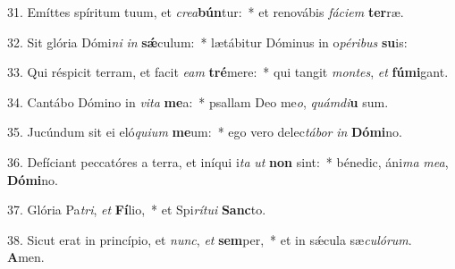 31. Emíttes spíritum tuum, et \textit{cre}\textit{a}\textbf{bún}tur:~*  et renovábis \textit{fá}\textit{ci}\textit{em} \textbf{ter}ræ.\

32. Sit glória Dómi\textit{ni} \textit{in} \textbf{sǽ}culum:~*  lætábitur Dóminus in o\textit{pé}\textit{ri}\textit{bus} \textbf{su}is:\

33. Qui réspicit terram, et facit \textit{e}\textit{am} \textbf{tré}mere:~*  qui tangit \textit{mon}\textit{tes}, \textit{et} \textbf{fú}\textbf{mi}gant.\

34. Cantábo Dómino in \textit{vi}\textit{ta} \textbf{me}a:~*  psallam Deo me\textit{o}, \textit{quám}\textit{di}\textbf{u} sum.\

35. Jucúndum sit ei eló\textit{qui}\textit{um} \textbf{me}um:~*  ego vero delec\textit{tá}\textit{bor} \textit{in} \textbf{Dó}\textbf{mi}no.\

36. Defíciant peccatóres a terra, et iníqui i\textit{ta} \textit{ut} \textbf{non} sint:~*  bénedic, áni\textit{ma} \textit{me}\textit{a}, \textbf{Dó}\textbf{mi}no.\

37. Glória Pa\textit{tri}, \textit{et} \textbf{Fí}lio,~*  et Spi\textit{rí}\textit{tu}\textit{i} \textbf{Sanc}to.\

38. Sicut erat in princípio, et \textit{nunc}, \textit{et} \textbf{sem}per,~*  et in sǽcula sæ\textit{cu}\textit{ló}\textit{rum}. \textbf{A}men.\

